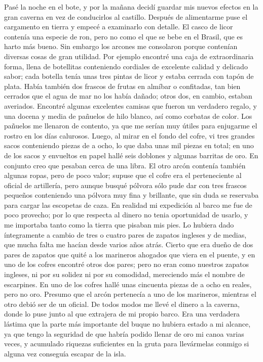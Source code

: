 \documentclass{novela}
\begin{document}
    Pasé la noche en el bote, y por la mañana decidí guardar mis nuevos efectos en la gran caverna en vez de conducirlos al castillo. Después de alimentarme puse el cargamento en tierra y empecé a examinarlo con detalle. El casco de licor contenía una especie de ron, pero no como el que se bebe en el Brasil, que es harto más bueno. Sin embargo los arcones me consolaron porque contenían diversas cosas de gran utilidad. Por ejemplo encontré una caja de extraordinaria forma, llena de botellitas conteniendo cordiales de excelente calidad y delicado sabor; cada botella tenía unas tres pintas de licor y estaba cerrada con tapón de plata. Había también dos frascos de frutas en almíbar o confitadas, tan bien cerrados que el agua de mar no los había dañado; otros dos, en cambio, estaban averiados. Encontré algunas excelentes camisas que fueron un verdadero regalo, y una docena y media de pañuelos de hilo blanco, así como corbatas de color. Los pañuelos me llenaron de contento, ya que me serían muy útiles para enjugarme el rostro en los días calurosos. Luego, al mirar en el fondo del cofre, vi tres grandes sacos conteniendo piezas de a ocho, lo que daba unas mil piezas en total; en uno de los sacos y envueltos en papel hallé seis doblones y algunas barritas de oro. En conjunto creo que pesaban cerca de una libra.
    El otro arcón contenía también algunas ropas, pero de poco valor; supuse que el cofre era el perteneciente al oficial de artillería, pero aunque busqué pólvora sólo pude dar con tres frascos pequeños conteniendo una pólvora muy fina y brillante, que sin duda se reservaba para cargar las escopetas de caza. En realidad mi expedición al barco me fue de poco provecho; por lo que respecta al dinero no tenia oportunidad de usarlo, y me importaba tanto como la tierra que pisaban mis pies. Lo hubiera dado íntegramente a cambio de tres o cuatro pares de zapatos ingleses y de medias, que mucha falta me hacían desde varios años atrás. Cierto que era dueño de dos pares de zapatos que quité a los marineros ahogados que viera en el puente, y en uno de los cofres encontré otros dos pares; pero no eran como nuestros zapatos ingleses, ni por su solidez ni por su comodidad, mereciendo más el nombre de escarpines. En uno de los cofres hallé unas cincuenta piezas de a ocho en reales, pero no oro. Presumo que el arcón pertenecía a uno de los marineros, mientras el otro debió ser de un oficial.
    De todos modos me llevé el dinero a la caverna, donde lo puse junto al que extrajera de mi propio barco. Era una verdadera lástima que la parte más importante del buque no hubiera estado a mi alcance, ya que tengo la seguridad de que habría podido llenar de oro mi canoa varias veces, y acumulado riquezas suficientes en la gruta para llevármelas conmigo si alguna vez conseguía escapar de la isla.
\end{document}

